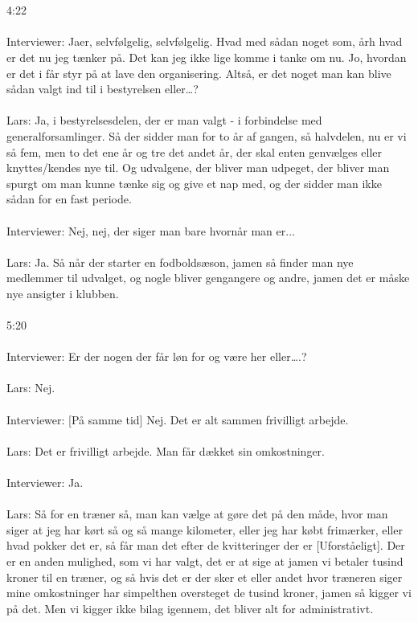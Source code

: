 \\\\
4:22
\\\\
Interviewer: Jaer, selvfølgelig, selvfølgelig. Hvad med sådan noget som, årh hvad er det nu jeg tænker på. Det kan jeg ikke lige komme i tanke om nu. Jo, hvordan er det i får styr på at lave den organisering. Altså, er det noget man kan blive sådan valgt ind til i bestyrelsen eller…?
\\\\
Lars: Ja, i bestyrelsesdelen, der er man valgt - i forbindelse med generalforsamlinger. Så der sidder man for to år af gangen, så halvdelen, nu er vi så fem, men to det ene år og tre det andet år, der skal enten genvælges eller knyttes/kendes nye til. Og udvalgene, der bliver man udpeget, der bliver man spurgt om man kunne tænke sig og give et nap med, og der sidder man ikke sådan for en fast periode.
\\\\
Interviewer: Nej, nej, der siger man bare hvornår man er...
\\\\
Lars: Ja. Så når der starter en fodboldsæson, jamen så finder man nye medlemmer til udvalget, og nogle bliver gengangere og andre, jamen det er måske nye ansigter i klubben.
\\\\
5:20
\\\\
Interviewer: Er der nogen der får løn for og være her eller….?
\\\\
Lars: Nej.
\\\\
Interviewer: [På samme tid] Nej. Det er alt sammen frivilligt arbejde.
\\\\
Lars: Det er frivilligt arbejde. Man får dækket sin omkostninger.
\\\\
Interviewer: Ja.
\\\\
Lars: Så for en træner så, man kan vælge at gøre det på den måde, hvor man siger at jeg har kørt så og så mange kilometer, eller jeg har købt frimærker, eller hvad pokker det er, så får man det efter de kvitteringer der er [Uforståeligt]. Der er en anden mulighed, som vi har valgt, det er at sige at jamen vi betaler tusind kroner til en træner, og så hvis det er der sker et eller andet hvor træneren siger mine omkostninger har simpelthen oversteget de tusind kroner, jamen så kigger vi på det. Men vi kigger ikke bilag igennem, det bliver alt for administrativt.
